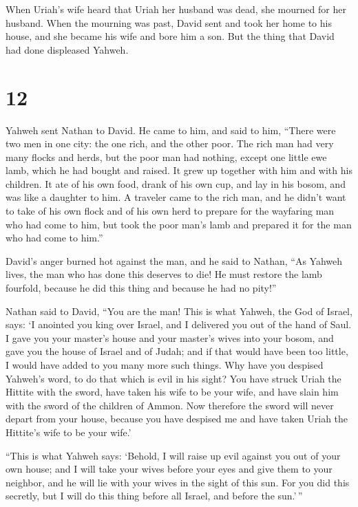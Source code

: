  When Uriah's wife heard that Uriah her husband was dead,
she mourned for her husband.  When the mourning was past,
David sent and took her home to his house, and she became his wife and
bore him a son. But the thing that David had done displeased Yahweh.

\hypertarget{section-11}{%
\section{12}\label{section-11}}

 Yahweh sent Nathan to David. He came to him, and said to
him, ``There were two men in one city: the one rich, and the other poor.
 The rich man had very many flocks and herds,
 but the poor man had nothing, except one little ewe lamb,
which he had bought and raised. It grew up together with him and with
his children. It ate of his own food, drank of his own cup, and lay in
his bosom, and was like a daughter to him.  A traveler
came to the rich man, and he didn't want to take of his own flock and of
his own herd to prepare for the wayfaring man who had come to him, but
took the poor man's lamb and prepared it for the man who had come to
him.''

 David's anger burned hot against the man, and he said to
Nathan, ``As Yahweh lives, the man who has done this deserves to die!
 He must restore the lamb fourfold, because he did this
thing and because he had no pity!''

 Nathan said to David, ``You are the man! This is what
Yahweh, the God of Israel, says: `I anointed you king over Israel, and I
delivered you out of the hand of Saul.  I gave you your
master's house and your master's wives into your bosom, and gave you the
house of Israel and of Judah; and if that would have been too little, I
would have added to you many more such things.  Why have
you despised Yahweh's word, to do that which is evil in his sight? You
have struck Uriah the Hittite with the sword, have taken his wife to be
your wife, and have slain him with the sword of the children of Ammon.
 Now therefore the sword will never depart from your
house, because you have despised me and have taken Uriah the Hittite's
wife to be your wife.'

 ``This is what Yahweh says: `Behold, I will raise up
evil against you out of your own house; and I will take your wives
before your eyes and give them to your neighbor, and he will lie with
your wives in the sight of this sun.  For you did this
secretly, but I will do this thing before all Israel, and before the
sun.'\,''

